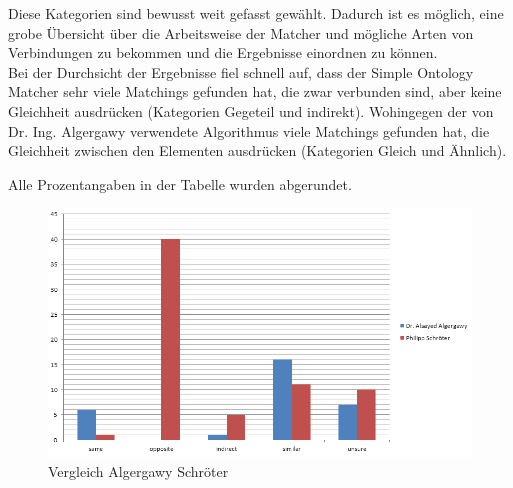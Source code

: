 		Diese Kategorien sind bewusst weit gefasst gewählt. Dadurch ist es
		möglich, eine grobe Übersicht über die Arbeitsweise der Matcher und mögliche
		Arten von Verbindungen zu bekommen und die Ergebnisse einordnen zu können.\\
		Bei der Durchsicht der Ergebnisse fiel schnell auf, dass der Simple Ontology
		Matcher sehr viele Matchings gefunden hat, die zwar verbunden sind, aber keine
		Gleichheit ausdrücken (Kategorien Gegeteil und indirekt).
		Wohingegen der von Dr. Ing. Algergawy verwendete Algorithmus viele Matchings
		gefunden hat, die Gleichheit zwischen den Elementen ausdrücken (Kategorien
		Gleich und Ähnlich).\\
		
		\begin{center}
		\begin{table}[h!]
		\small
		\setlength\tabcolsep{2pt}
		\caption{Kategorisierte Ergebnisse}
		\noindent{}
		\end{table}
		\end{center}
		Alle Prozentangaben in der Tabelle wurden abgerundet.\\
				
		\begin{figure}[h!]
		\centering
		\includegraphics[width=1.0\textwidth]{pics/Vergleich-Algergawy-Schroeter_2016-11-22.png}
		\caption{Vergleich Algergawy Schröter}
		\label{fig16}
		\end{figure}
		
